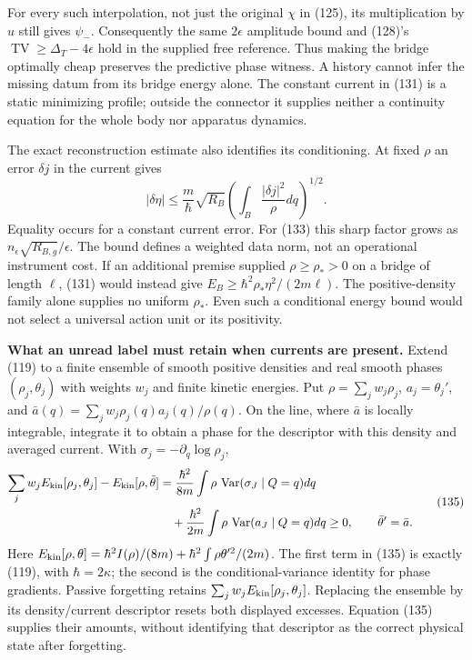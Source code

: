 \documentclass[11pt,a4paper]{article}
\begin{document}
For every such interpolation, not just the original \(\chi\) in (125),
its multiplication by \(u\) still gives \(\psi_-\). Consequently the
same \(2\epsilon\) amplitude bound and (128)'s
\(\operatorname{TV}\ge\Delta_T-4\epsilon\) hold in the supplied free
reference. Thus making the bridge optimally cheap preserves the
predictive phase witness. A history cannot infer the missing datum from
its bridge energy alone. The constant current in (131) is a static
minimizing profile; outside the connector it supplies neither a
continuity equation for the whole body nor apparatus dynamics.

The exact reconstruction estimate also identifies its conditioning. At
fixed \(\rho\) an error \(\delta j\) in the current gives
\[|\delta\eta|\le\frac m\hbar\sqrt{R_B}
       \left(\int_B\frac{|\delta j|^2}{\rho}dq\right)^{1/2}.
\tag{134}\] Equality occurs for a constant current error. For (133) this
sharp factor grows as \(n_\epsilon\sqrt{R_{B,g}}/\epsilon\). The bound
defines a weighted data norm, not an operational instrument cost. If an
additional premise supplied \(\rho\ge\rho_*>0\) on a bridge of length
\(\ell\), (131) would instead give
\(E_B\ge\hbar^2\rho_*\eta^2/(2m\ell)\). The positive-density family
alone supplies no uniform \(\rho_*\). Even such a conditional energy
bound would not select a universal action unit or its positivity.

\textbf{What an unread label must retain when currents are present.}
Extend (119) to a finite ensemble of smooth positive densities and real
smooth phases \((\rho_j,\theta_j)\) with weights \(w_j\) and finite
kinetic energies. Put \(\rho=\sum_jw_j\rho_j\), \(a_j=\theta_j'\), and
\(\bar a(q)=\sum_jw_j\rho_j(q)a_j(q)/\rho(q)\). On the line, where
\(\bar a\) is locally integrable, integrate it to obtain a phase for the
descriptor with this density and averaged current. With
\(\sigma_j=-\partial_q\log\rho_j\), \[\begin{aligned}
\sum_jw_jE_{\rm kin}[\rho_j,\theta_j]
 -E_{\rm kin}[\rho,\bar\theta]
 &=\frac{\hbar^2}{8m}\int\rho\,
        \operatorname{Var}(\sigma_J\mid Q=q)dq\\
 &\quad+\frac{\hbar^2}{2m}\int\rho\,
        \operatorname{Var}(a_J\mid Q=q)dq\ge0,
\qquad\bar\theta'=\bar a.
\end{aligned}\tag{135}\] Here
\(E_{\rm kin}[\rho,\theta]=\hbar^2 I(\rho)/(8m) +\hbar^2\int\rho\theta'^2/(2m)\).
The first term in (135) is exactly (119), with \(\hbar=2\kappa\); the
second is the conditional-variance identity for phase gradients. Passive
forgetting retains \(\sum_jw_jE_{\rm kin}[\rho_j,\theta_j]\). Replacing
the ensemble by its density/current descriptor resets both displayed
excesses. Equation (135) supplies their amounts, without identifying
that descriptor as the correct physical state after forgetting.
\end{document}
